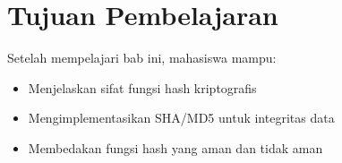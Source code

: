 \section*{Tujuan Pembelajaran}
Setelah mempelajari bab ini, mahasiswa mampu:
\begin{itemize}
\item Menjelaskan sifat fungsi hash kriptografis
\item Mengimplementasikan SHA/MD5 untuk integritas data
\item Membedakan fungsi hash yang aman dan tidak aman
\end{itemize}

